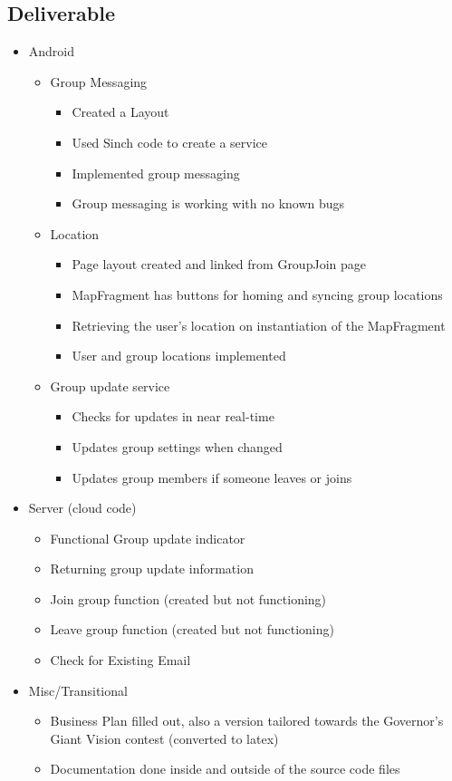 \subsection{Deliverable}
\begin{itemize}
	\item Android
	\begin{itemize}
		\item Group Messaging
		\begin{itemize}
			\item Created a Layout
			\item Used Sinch code to create a service
			\item Implemented group messaging
			\item Group messaging is working with no known bugs
			\end{itemize}
		\item Location
		\begin{itemize}
			\item Page layout created and linked from GroupJoin page
			\item MapFragment has buttons for homing and syncing group locations
			\item Retrieving the user's location on instantiation of the MapFragment
			\item User and group locations implemented
		\end{itemize}
		\item Group update service
		\begin{itemize}
			\item Checks for updates in near real-time
			\item Updates group settings when changed
			\item Updates group members if someone leaves or joins
		\end{itemize}
	\end{itemize}
	\item Server (cloud code)
	\begin{itemize}
		\item Functional Group update indicator
		\item Returning group update information
		\item Join group function (created but not functioning)
		\item Leave group function (created but not functioning)
		\item Check for Existing Email
	\end{itemize}	
	\item Misc/Transitional
	\begin{itemize}
		\item Business Plan filled out, also a version tailored towards the Governor's Giant Vision contest (converted to latex)
		\item Documentation done inside and outside of the source code files
	\end{itemize}
\end{itemize}
